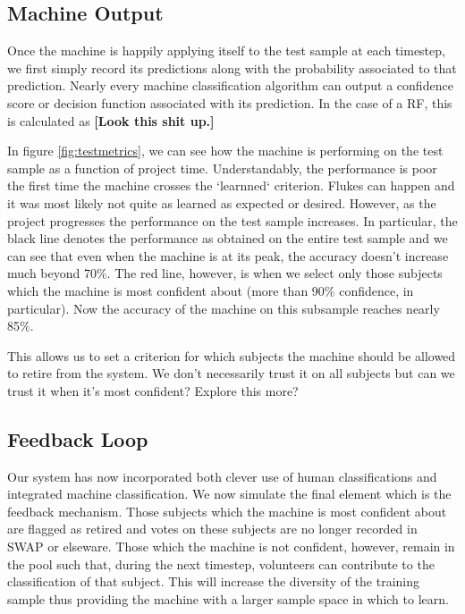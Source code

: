 \documentclass[twocolumn]{aastex6}
\begin{document}
\subsection{Machine Output}
Once the machine is happily applying itself to the test sample at each timestep, 
we first simply record its predictions along with the probability associated to that
prediction.  Nearly every machine classification algorithm can output a confidence
score or decision function associated with its prediction. In the case of a RF, 
this is calculated as \textbf{[Look this shit up.]} 

In figure \ref{fig:testmetrics},
we can see how the machine is performing on the test sample as a function of 
project time. Understandably, the performance is poor the first time the machine 
crosses the `learnned` criterion. Flukes can happen and it was most likely not
quite as learned as expected or desired. However, as the project progresses the 
performance on the test sample increases. In particular, the black line denotes 
the performance as obtained on the entire test sample and we can see that even 
when the machine is at its peak, the accuracy doesn't increase much beyond 70\%. 
The red line, however, is when we select only those subjects which the machine is
most confident about (more than 90\% confidence, in particular). Now the accuracy
of the machine on this subsample reaches nearly 85\%.  

This allows us to set a criterion for which subjects the machine should be allowed
to retire from the system. We don't necessarily trust it on all subjects but can we 
trust it when it's most confident? Explore this more? 

\subsection{Feedback Loop}
Our system has now incorporated both clever use of human classifications and 
integrated machine classification. We now simulate the final element which is the
feedback mechanism. Those subjects which the machine is most confident about are 
flagged as retired and votes on these subjects are no longer recorded in SWAP or 
elseware. Those which the machine is not confident, however, remain in the pool 
such that, during the next timestep, volunteers can contribute to the classification 
of that subject. This will increase the diversity of the training sample thus 
providing the machine with a larger sample space in which to learn. 
\end{document}
